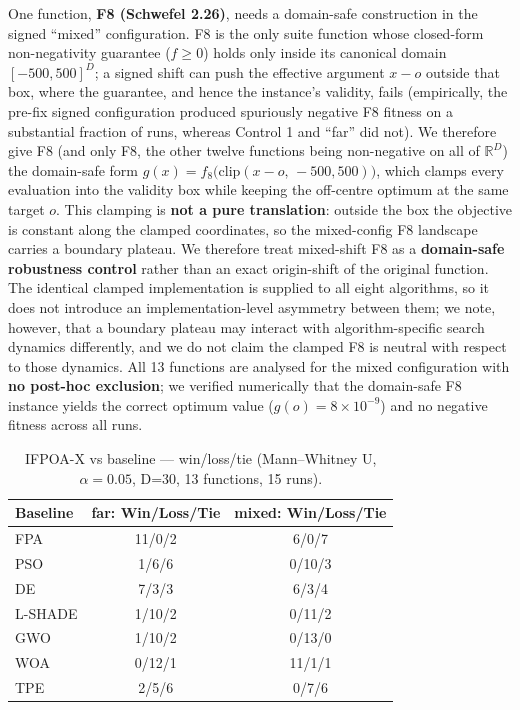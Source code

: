 \documentclass[preprint,12pt]{elsarticle}
\begin{document}
One function, \textbf{F8 (Schwefel 2.26)}, needs a domain-safe construction in the signed ``mixed'' configuration. F8 is the only suite function whose closed-form non-negativity guarantee ($f \geq 0$) holds only inside its canonical domain $[-500, 500]^D$; a signed shift can push the effective argument $x - o$ outside that box, where the guarantee, and hence the instance's validity, fails (empirically, the pre-fix signed configuration produced spuriously negative F8 fitness on a substantial fraction of runs, whereas Control 1 and ``far'' did not). We therefore give F8 (and only F8, the other twelve functions being non-negative on all of $\mathbb{R}^D$) the domain-safe form $g(x) = f_8\big(\mathrm{clip}(x - o,\, -500, 500)\big)$, which clamps every evaluation into the validity box while keeping the off-centre optimum at the same target $o$. This clamping is \textbf{not a pure translation}: outside the box the objective is constant along the clamped coordinates, so the mixed-config F8 landscape carries a boundary plateau. We therefore treat mixed-shift F8 as a \textbf{domain-safe robustness control} rather than an exact origin-shift of the original function. The identical clamped implementation is supplied to all eight algorithms, so it does not introduce an implementation-level asymmetry between them; we note, however, that a boundary plateau may interact with algorithm-specific search dynamics differently, and we do not claim the clamped F8 is neutral with respect to those dynamics. All 13 functions are analysed for the mixed configuration with \textbf{no post-hoc exclusion}; we verified numerically that the domain-safe F8 instance yields the correct optimum value ($g(o) = 8\times10^{-9}$) and no negative fitness across all runs.

\begin{table}[htbp]
\centering
\caption{IFPOA-X vs baseline --- win/loss/tie (Mann--Whitney U, $\alpha=0.05$, D=30, 13 functions, 15 runs).}
\label{tab:farmixedwlt}
\begin{tabular}{lcc}
\hline
Baseline & far: Win/Loss/Tie & mixed: Win/Loss/Tie \\
\hline
FPA & 11/0/2 & 6/0/7 \\
PSO & 1/6/6 & 0/10/3 \\
DE & 7/3/3 & 6/3/4 \\
L-SHADE & 1/10/2 & 0/11/2 \\
GWO & 1/10/2 & 0/13/0 \\
WOA & 0/12/1 & 11/1/1 \\
TPE & 2/5/6 & 0/7/6 \\
\hline
\end{tabular}
\end{table}
\end{document}
